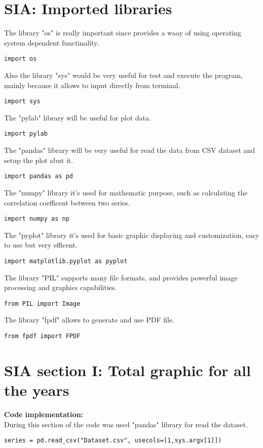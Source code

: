 
\section{SIA: Imported libraries}
\label{SIA_libraries}
The library "os" is really important since provides a waay of using operating system dependent functinality.
\begin{lstlisting}
import os
\end{lstlisting}

Also the library "sys" would be very useful for test and execute the program, mainly because it allows to input directly from terminal.
\begin{lstlisting}
import sys
\end{lstlisting}

The "pylab" library will be useful for plot data.
\begin{lstlisting}
import pylab
\end{lstlisting}

The "pandas" library will be very useful for read the data from CSV dataset and setup the plot abut it.
\begin{lstlisting}
import pandas as pd
\end{lstlisting}

The "numpy" library it's used for mathematic purpose, such as calculating the correlation coefficent between two series.
\begin{lstlisting}
import numpy as np
\end{lstlisting}
 
The "pyplot" library it's used for basic graphic displaying and customization, easy to use but very efficent.
\begin{lstlisting}
import matplotlib.pyplot as pyplot
\end{lstlisting}

The library "PIL" supports many file formats, and provides powerful image processing and graphics capabilities.
\begin{lstlisting}
from PIL import Image
\end{lstlisting}

The library "fpdf" allows to generate and use PDF file.
\begin{lstlisting}
from fpdf import FPDF
\end{lstlisting}

\section{SIA section I: Total graphic for all the years}
\label{SIA_section_I}
\textbf{Code implementation:}\\
During this section of the code was used "pandas" library for read the dataset.
\begin{lstlisting}
series = pd.read_csv("Dataset.csv", usecols=[1,sys.argv[1]])
\end{lstlisting}

